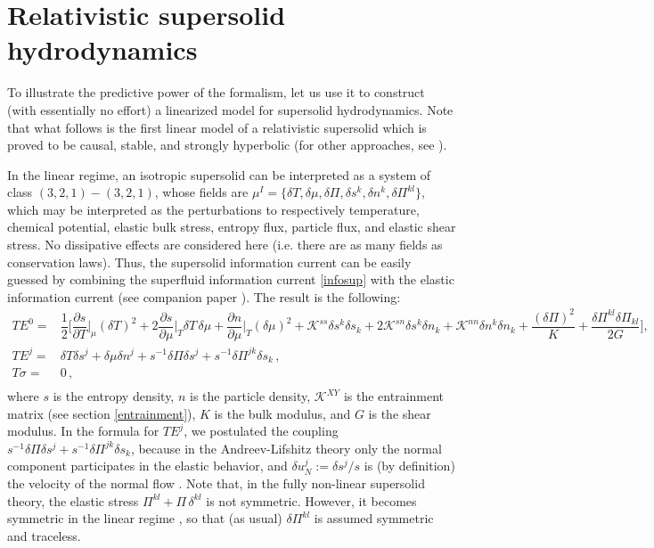\documentclass[a4paper, amsfonts, amssymb, amsmath, reprint, showkeys, nofootinbib, twoside, onecolumn,notitlepage]{revtex4-1}
\begin{document}
\section{Relativistic supersolid hydrodynamics}\label{sec:supersolid}

To illustrate the predictive power of the formalism, let us use it to construct (with essentially no effort) a linearized model for supersolid hydrodynamics. Note that what follows is the first linear model of a relativistic supersolid which is proved to be causal, stable, and strongly hyperbolic (for other approaches, see \cite{Pelemetrski2009,NicolisSupersolid2014}). 



In the linear regime, an isotropic supersolid can be interpreted as a system of class $(3,2,1)-(3,2,1)$, whose fields are $\mu^I=\{\delta T, \delta \mu, \delta \Pi, \delta s^k, \delta n^k, \delta \Pi^{kl} \}$, which may be interpreted as the perturbations to respectively temperature, chemical potential, elastic bulk stress, entropy flux, particle flux, and elastic shear stress. No dissipative effects are considered here (i.e. there are as many fields as conservation laws). Thus, the supersolid information current can be easily guessed by combining the superfluid information current \eqref{infosup} with the elastic information current (see companion paper \cite{paperI}). The result is the following:
\begin{equation}\label{infosupsol}
\begin{split}
TE^0 ={}& \dfrac{1}{2} \bigg[\dfrac{\partial s}{\partial T}\bigg|_{\mu}  \! \! \! (\delta T)^2 {+} 2 \dfrac{\partial s}{\partial \mu}\bigg|_{T}  \! \! \! \delta T \, \delta \mu {+} \dfrac{\partial n}{\partial \mu}\bigg|_{T}  \! \! \!(\delta \mu)^2 + \mathcal{K}^{ss}\delta s^k \delta s_k + 2\mathcal{K}^{sn}\delta s^k \delta n_k + \mathcal{K}^{nn}\delta n^k \delta n_k + \dfrac{(\delta \Pi)^2}{K} {+} \dfrac{\delta \Pi^{kl}\delta \Pi_{kl}}{2G} \bigg]  , \\
TE^j ={}& \delta T \delta s^j +\delta \mu \delta n^j + s^{-1} \delta \Pi \delta s^j + s^{-1} \delta \Pi^{jk} \delta s_k \, , \\
T\sigma ={}& 0 \, , \\
\end{split}
\end{equation}
where $s$ is the entropy density, $n$ is the particle density, $\mathcal{K}^{XY}$ is the entrainment matrix (see section \ref{entrainment}), $K$ is the bulk modulus, and $G$ is the shear modulus. In the formula for $TE^j$, we postulated the coupling $ s^{-1} \delta \Pi \delta s^j + s^{-1} \delta \Pi^{jk} \delta s_k$, because in the Andreev-Lifshitz theory \cite{Andreev1969} only the normal component participates in the elastic behavior, and $\delta u_N^j:=\delta s^j/s$ is (by definition) the velocity of the normal flow \cite{Termo,GavassinoKhalatnikov2022}. Note that, in the fully non-linear supersolid theory, the elastic stress $\Pi^{kl} +\Pi \, \delta^{kl}$ is not symmetric. However, it becomes symmetric in the linear regime \cite{Andreev1969}, so that (as usual) $\delta \Pi^{kl}$ is assumed symmetric and traceless. 
\end{document}
